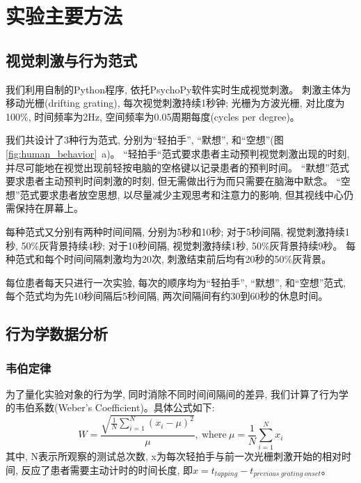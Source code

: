 \section{实验主要方法}

\subsection{视觉刺激与行为范式}

我们利用自制的Python程序, 依托PsychoPy软件\cite{psychopy}实时生成视觉刺激。
刺激主体为移动光栅(drifting grating), 每次视觉刺激持续1秒钟;
光栅为方波光栅, 对比度为100\%, 时间频率为2Hz, 空间频率为0.05周期每度(cycles per degree)。

我们共设计了3种行为范式, 分别为“轻拍手”, “默想”, 和“空想”(图\ref{fig:human_behavior}~a)。
“轻拍手“范式要求患者主动预判视觉刺激出现的时刻, 并尽可能地在视觉出现前轻按电脑的空格键以记录患者的预判时间。
“默想”范式要求患者主动预判时间刺激的时刻, 但无需做出行为而只需要在脑海中默念。
“空想”范式要求患者放空思想, 以尽量减少主观思考和注意力的影响, 但其视线中心仍需保持在屏幕上。

每种范式又分别有两种时间间隔, 分别为5秒和10秒;
对于5秒间隔, 视觉刺激持续1秒, 50\%灰背景持续4秒;
对于10秒间隔, 视觉刺激持续1秒, 50\%灰背景持续9秒。
每种范式和每个时间间隔刺激均为20次, 刺激结束前后均有20秒的50\%灰背景。

每位患者每天只进行一次实验, 每次的顺序均为“轻拍手”, “默想”, 和“空想”范式,
每个范式均为先10秒间隔后5秒间隔, 两次间隔间有约30到60秒的休息时间。

\subsection{行为学数据分析}

\subsubsection{韦伯定律}
为了量化实验对象的行为学, 同时消除不同时间间隔间的差异,
我们计算了行为学的韦伯系数(Weber's Coefficient)\cite{gibbon1977scalar, hardy2018encoding}。具体公式如下:
\begin{equation}
    W = \frac{\sqrt{\frac{1}{N} \sum_{i=1}^N (x_i - \mu) ^ 2}}{\mu},\ \mathrm{where}\ \mu = \frac{1}{N} \sum_{i=1}^N x_i
\end{equation}
其中, N表示所观察的测试总次数, x为每次轻拍手与前一次光栅刺激开始的相对时间, 反应了患者需要主动计时的时间长度,
即$ x = t_{tapping} - t_{previous\ grating\ onset} $。

